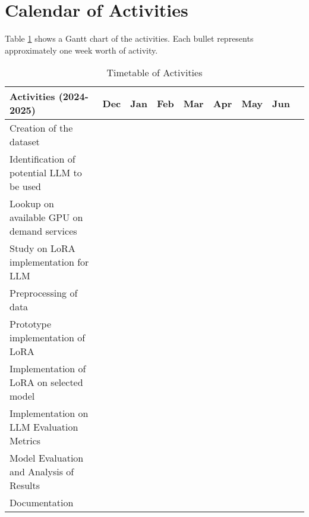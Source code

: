 \section{Calendar of Activities}

	Table \ref{tab:timetableactivities} shows a Gantt chart of the activities.  Each bullet represents approximately
	one week worth of activity.
	
	\newcommand{\weekone}{\textbullet}
	\newcommand{\weektwo}{\textbullet \textbullet}
	\newcommand{\weekthree}{\textbullet \textbullet \textbullet}
	\newcommand{\weekfour}{\textbullet \textbullet \textbullet \textbullet}
	
	
	\begin{table}[ht]  
		\centering
		\caption{Timetable of Activities} \vspace{0.25em}
		\begin{tabular}{|p{2in}|c|c|c|c|c|c|c|c|} \hline
			\centering Activities (2024-2025) 
			& Dec & Jan & Feb & Mar & Apr & May & Jun \\ \hline
			
			Creation of the dataset      
			&\weekone~~~ & & & & & &  \\ \hline
			
			Identification of potential LLM to be used 
			&\weekone~~~ & & & &  &  &  \\ \hline
			
			Lookup on available GPU on demand services     
			&\weekone~~~ & & & &  & &   \\ \hline
			
			Study on LoRA implementation for LLM     
			& ~\weekone & & & &  &  &  \\ \hline
			
			Preprocessing of data      
			& ~\weekthree & & & &  & &  \\ \hline
			
			Prototype implementation of LoRA 
			&~~~\weekone & \weekfour & & &  & &   \\ \hline
			
			Implementation of LoRA on selected model 
			& & &\weektwo~~ & &  &  &  \\ \hline
			
			Implementation on LLM Evaluation Metrics 
			& & &\weektwo  & &  &  &  \\ \hline
			
			Model Evaluation and Analysis of Results 
			& & & & \weekfour & &  &   \\ \hline
			
			Documentation 
			& ~~\weektwo  & \weekfour & \weekfour & \weekfour & \weekfour & &  \\ \hline
			
		\end{tabular}
		\label{tab:timetableactivities}
	\end{table}